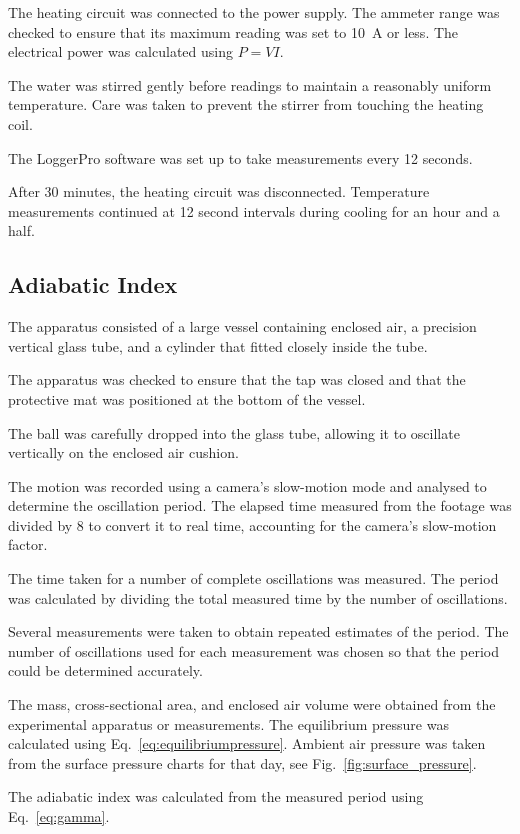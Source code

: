 \documentclass[12pt,a4paper]{article}
\begin{document}
The heating circuit was connected to the power supply.
The ammeter range was checked to ensure that its maximum
reading was set to \SI{10}{A} or less. The electrical power
was calculated using $P=VI$.

The water was stirred gently before readings to maintain
a reasonably uniform temperature. Care was taken to prevent
the stirrer from touching the heating coil.

The LoggerPro software was set up to take measurements 
every 12 seconds.

After 30 minutes, the heating circuit was disconnected.
Temperature measurements continued at 12 second intervals
during cooling for an hour and a half.

\subsection{Adiabatic Index}

The apparatus consisted of a large vessel containing enclosed
air, a precision vertical glass tube, and a cylinder that fitted 
closely inside the tube.

The apparatus was checked to ensure that the tap was
closed and that the protective mat was positioned at the
bottom of the vessel.

The ball was carefully dropped into the glass tube,
allowing it to oscillate vertically on the enclosed air
cushion.

The motion was recorded using a camera's slow-motion mode and
analysed to determine the oscillation period. The elapsed time
measured from the footage was divided by 8 to convert it to real
time, accounting for the camera's slow-motion factor.

The time taken for a number of complete oscillations
was measured. The period was calculated by dividing the
total measured time by the number of oscillations.

Several measurements were taken to obtain repeated
estimates of the period. The number of oscillations used
for each measurement was chosen so that the period could
be determined accurately.

The mass, cross-sectional area, and enclosed air
volume were obtained from the experimental apparatus or
measurements. The equilibrium pressure was calculated
using Eq.~\eqref{eq:equilibriumpressure}. Ambient air 
pressure was taken from the surface pressure charts for 
that day, see Fig.~\ref{fig:surface_pressure}.

The adiabatic index was calculated from the measured
period using Eq.~\eqref{eq:gamma}.
\end{document}
